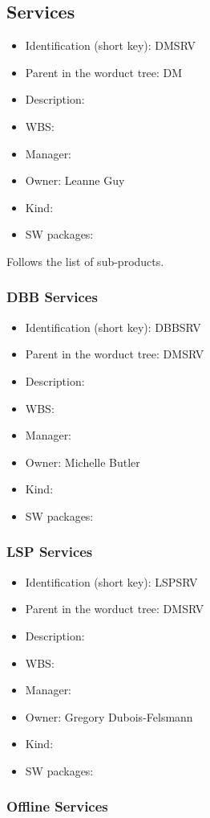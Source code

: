 \subsection{Services}
\begin{itemize}\item Identification (short key): DMSRV
\item Parent in the worduct tree: DM
\item Description: 
\item WBS: 
\item Manager: 
\item Owner: Leanne Guy
\item Kind:
\item SW packages: 
\end{itemize}Follows the list of sub-products.\subsubsection{DBB Services}
\begin{itemize}\item Identification (short key): DBBSRV
\item Parent in the worduct tree: DMSRV
\item Description: 
\item WBS: 
\item Manager: 
\item Owner: Michelle Butler
\item Kind:
\item SW packages: 
\end{itemize}\subsubsection{LSP Services}
\begin{itemize}\item Identification (short key): LSPSRV
\item Parent in the worduct tree: DMSRV
\item Description: 
\item WBS: 
\item Manager: 
\item Owner: Gregory Dubois-Felsmann
\item Kind:
\item SW packages: 
\end{itemize}\subsubsection{Offline Services}
